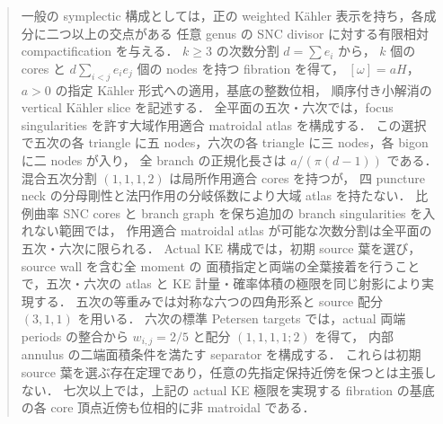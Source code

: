 \documentclass[11pt,a4paper]{article}
\begin{document}
\begin{abstract}
一般の symplectic 構成としては，正の weighted Kähler 表示を持ち，各成分に二つ以上の交点がある
任意 genus の SNC divisor に対する有限相対 compactification を与える．
$k\ge3$ の次数分割 $d=\sum e_i$ から，
$k$ 個の cores と $d\sum_{i<j}e_i e_j$ 個の nodes を持つ fibration を得て，
$[\omega]=aH$，$a>0$ の指定 Kähler 形式への適用，基底の整数位相，
順序付き小解消の vertical Kähler slice を記述する．
全平面の五次・六次では，focus singularities を許す大域作用適合 matroidal atlas を構成する．
この選択で五次の各 triangle に五 nodes，六次の各 triangle に三 nodes，各 bigon に二 nodes が入り，
全 branch の正規化長さは $a/(\pi(d-1))$ である．
混合五次分割 $(1,1,1,2)$ は局所作用適合 cores を持つが，
四 puncture neck の分母剛性と法円作用の分岐係数により大域 atlas を持たない．
比例曲率 SNC cores と branch graph を保ち追加の branch singularities を入れない範囲では，
作用適合 matroidal atlas が可能な次数分割は全平面の五次・六次に限られる．
Actual KE 構成では，初期 source 葉を選び，source wall を含む全 moment の
面積指定と両端の全葉接着を行うことで，五次・六次の atlas と
KE 計量・確率体積の極限を同じ射影により実現する．
五次の等重みでは対称な六つの四角形系と source 配分 $(3,1,1)$ を用いる．
六次の標準 Petersen targets では，actual 両端 periods の整合から
$w_{i,j}=2/5$ と配分 $(1,1,1,1;2)$ を得て，
内部 annulus の二端面積条件を満たす separator を構成する．
これらは初期 source 葉を選ぶ存在定理であり，任意の先指定保持近傍を保つとは主張しない．
七次以上では，上記の actual KE 極限を実現する fibration の基底の各 core 頂点近傍も位相的に非 matroidal である．
\end{abstract}
\clearpage
\tableofcontents
\clearpage



















\end{document}
